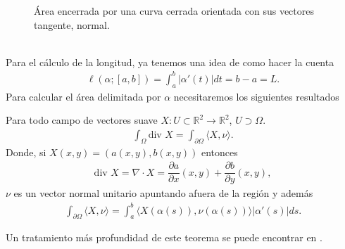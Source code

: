 \documentclass[oneside,11pt]{memoir}
\begin{document}
\begin{figure}[h]
\begin{center}
    \end{center}
    \caption{Área encerrada por una curva cerrada orientada con sus vectores tangente, normal.}
    \label{fig:areayorientasion}
\end{figure}
\\

Para el cálculo de la longitud, ya tenemos una idea de como hacer la cuenta
\begin{align*}
    \ell(\alpha;[a,b])=\int_a^b|\alpha'(t)|dt=b-a=L.
\end{align*}
Para calcular el área delimitada por $\alpha$ necesitaremos los siguientes resultados
\begin{theorem}
    Para todo campo de vectores suave $X:U\subset\mathbb{R}^2\to\mathbb{R}^2$, $U\supset \Omega$.
    \begin{align*}
        \int_\Omega \text{div 
 }X=\int_{\partial \Omega}\langle X,\nu\rangle.
    \end{align*}
    Donde, si $X(x,y)=(a(x,y),b(x,y))$ entonces
    \begin{align*}
    \text{div }X=\nabla \cdot X=\dfrac{\partial a}{\partial x}(x,y)+\dfrac{\partial b}{\partial y}(x,y),
    \end{align*}
    $\nu$ es un vector normal unitario apuntando afuera de la región y además
    \begin{align*}
        \int_{\partial \Omega}\langle X,\nu\rangle= \int_a^b\langle X(\alpha(s)),\nu(\alpha(s))\rangle |\alpha'(s)|ds.
    \end{align*}
\end{theorem}
Un tratamiento más profundidad de este teorema se puede encontrar en \cite{lima1981curso}. 
\end{document}
